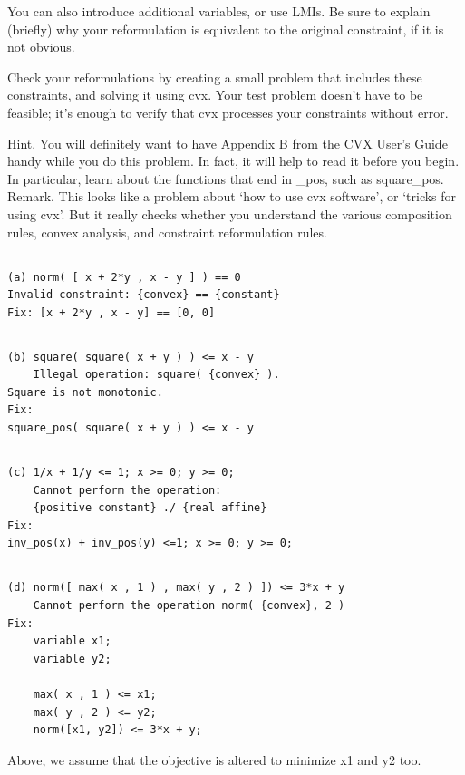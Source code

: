 \documentclass{article}
\begin{document}
You can also introduce additional variables, or use LMIs. Be sure to explain (briefly) why your reformulation is equivalent to the original constraint, if it is not obvious.

Check your reformulations by creating a small problem that includes these constraints, and solving it using cvx. Your test problem doesn’t have to be feasible; it’s enough to verify that cvx processes your constraints without error.

Hint. You will definitely want to have Appendix B from the CVX User’s Guide handy while you do this problem. In fact, it will help to read it before you begin. In particular, learn about the functions that end in \_pos, such as square\_pos.
Remark. This looks like a problem about ‘how to use cvx software’, or ‘tricks for using cvx’. But it
really checks whether you understand the various composition rules, convex analysis, and constraint
reformulation rules.

\subsection{}
\begin{verbatim}
(a) norm( [ x + 2*y , x - y ] ) == 0
Invalid constraint: {convex} == {constant}
Fix: [x + 2*y , x - y] == [0, 0]
\end{verbatim}

\subsection{}
\begin{verbatim}
(b) square( square( x + y ) ) <= x - y
    Illegal operation: square( {convex} ).
Square is not monotonic.
Fix:
square_pos( square( x + y ) ) <= x - y
\end{verbatim}

\subsection{}
\begin{verbatim}
(c) 1/x + 1/y <= 1; x >= 0; y >= 0;
    Cannot perform the operation: 
    {positive constant} ./ {real affine}
Fix:
inv_pos(x) + inv_pos(y) <=1; x >= 0; y >= 0;
\end{verbatim}

\subsection{}
\begin{verbatim}
(d) norm([ max( x , 1 ) , max( y , 2 ) ]) <= 3*x + y
    Cannot perform the operation norm( {convex}, 2 )
Fix:
    variable x1;
    variable y2;
    
    max( x , 1 ) <= x1;
    max( y , 2 ) <= y2;
    norm([x1, y2]) <= 3*x + y;
\end{verbatim}
Above, we assume that the objective is altered to minimize x1 and y2 too.
\end{document}
